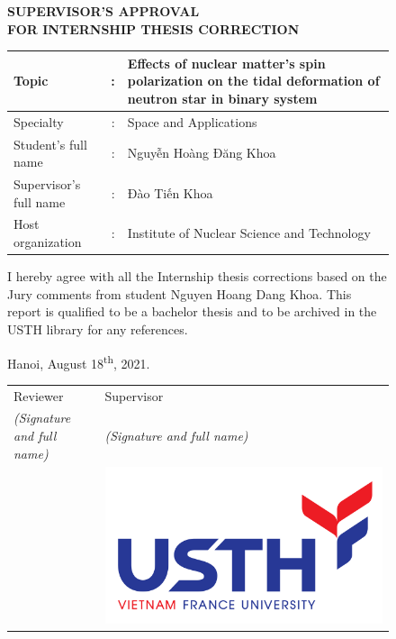 \documentclass[a4paper,12pt]{article}
\theoremstyle{plain}\newtheorem{ques}{Question}
\theoremstyle{definition}\newtheorem*{ans}{Answer}
\begin{document}
        \begin{figure}
        \begin{center}
            \Large
            \textbf{SUPERVISOR'S APPROVAL\\ FOR INTERNSHIP THESIS CORRECTION}
        \end{center}
        \vspace{1cm}

        \begin{otherlanguage}{vietnamese}
        \begin{tabular}{|l|c|p{10.5cm}|}
            \hline
            Topic & : & Effects of nuclear matter's spin polarization on the tidal deformation of neutron star in binary system\\[7mm]
            \hline
            Specialty & : & Space and Applications\\[3mm]
            \hline
            Student's full name & : & Nguyễn Hoàng Đăng Khoa \\[3mm]
            \hline
            Supervisor's full name & : & Đào Tiến Khoa \\[3mm]
            \hline
            Host organization & : & Institute of Nuclear Science and Technology\\
            \hline
        \end{tabular}
        \vspace{1cm}

        I hereby agree with all the Internship thesis corrections based on the Jury comments from student Nguyen Hoang Dang Khoa. This report is qualified to be a bachelor thesis and to be archived in the USTH library for any references.\\
        \vspace{1cm}

        \begin{flushright}
            Hanoi, August 18\textsuperscript{th}, 2021.
        \end{flushright}
        \begin{tabular}{>{\centering\arraybackslash}p{} >{\centering\arraybackslash}p{}}
            Reviewer & Supervisor\\
            \textit{(Signature and full name)} & \textit{(Signature and full name)}\\[7mm]
            & \includegraphics[scale=0.03]{logo/USTH_logo.png}
        \end{tabular}
        \end{otherlanguage}
        \end{figure}
\end{document}

